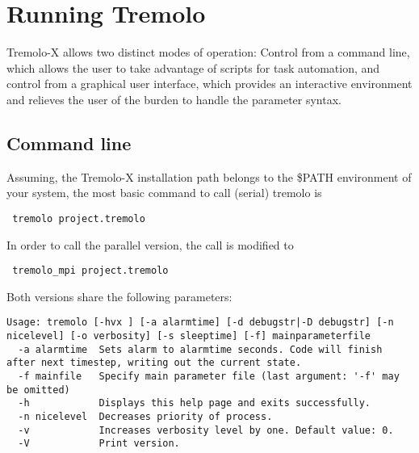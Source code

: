 \chapter{Running Tremolo}
\label{running_tremolo}

Tremolo-X allows two distinct modes of operation: Control from a command line, which allows the user to take advantage of scripts for task automation, and control from a graphical user interface, which provides an interactive environment and relieves the user of the burden to handle the parameter syntax.

\section{Command line}

Assuming, the Tremolo-X installation path belongs to the \$PATH environment of your system,
the most basic command to call (serial) tremolo is 
\begin{lstlisting}
 tremolo project.tremolo
\end{lstlisting}

In order to call the parallel version, the call is modified to 
\begin{lstlisting}
 tremolo_mpi project.tremolo
\end{lstlisting}

Both versions share the following parameters:
\begin{lstlisting}
Usage: tremolo [-hvx ] [-a alarmtime] [-d debugstr|-D debugstr] [-n nicelevel] [-o verbosity] [-s sleeptime] [-f] mainparameterfile
  -a alarmtime  Sets alarm to alarmtime seconds. Code will finish after next timestep, writing out the current state.
  -f mainfile   Specify main parameter file (last argument: '-f' may be omitted)
  -h            Displays this help page and exits successfully.
  -n nicelevel  Decreases priority of process.
  -v            Increases verbosity level by one. Default value: 0.
  -V            Print version.
\end{lstlisting}


